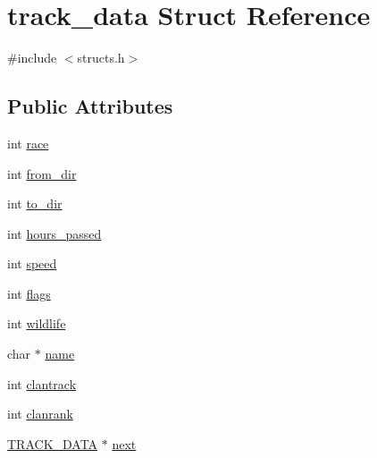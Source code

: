 \hypertarget{structtrack__data}{\section{track\-\_\-data Struct Reference}
\label{structtrack__data}
}


{\ttfamily \#include $<$structs.\-h$>$}

\subsection*{Public Attributes}
\begin{DoxyCompactItemize}
\item 
int \hyperlink{structtrack__data_a5de35871ef6b761e649af2b77452c392}{race}
\item 
int \hyperlink{structtrack__data_ad08d0b43c25fcad25ba82bf68dd00884}{from\-\_\-dir}
\item 
int \hyperlink{structtrack__data_afcae154543b99595a718f7eae7c64871}{to\-\_\-dir}
\item 
int \hyperlink{structtrack__data_af4f3d04157357eedd375309185853bd6}{hours\-\_\-passed}
\item 
int \hyperlink{structtrack__data_a36a4f55640b09422b99d3d096bd03153}{speed}
\item 
int \hyperlink{structtrack__data_a82bd7b9d90edd63ac1ba44afccf051f5}{flags}
\item 
int \hyperlink{structtrack__data_aa59f6165884a647bc84e7d94ecda164f}{wildlife}
\item 
char $\ast$ \hyperlink{structtrack__data_ab9e6413e572c2f0d708ffc27fd8948ec}{name}
\item 
int \hyperlink{structtrack__data_a39d1099f1c751a13cf5326a1217e8df7}{clantrack}
\item 
int \hyperlink{structtrack__data_a5fe2d58facd7b6441340aafbeb5854b2}{clanrank}
\item 
\hyperlink{structs_8h_af9d52b956546cea804db50a106a26e61}{T\-R\-A\-C\-K\-\_\-\-D\-A\-T\-A} $\ast$ \hyperlink{structtrack__data_a5211c02aba386a1c120235dcc6333916}{next}
\end{DoxyCompactItemize}


